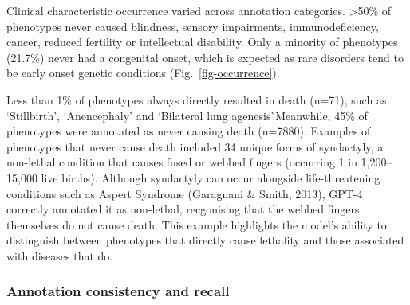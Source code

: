 \documentclass[
]{agujournal2019}
\begin{document}
Clinical characteristic occurrence varied across annotation categories.
\textgreater50\% of phenotypes never caused blindness, sensory
impairments, immunodeficiency, cancer, reduced fertility or intellectual
disability. Only a minority of phenotypes (21.7\%) never had a
congenital onset, which is expected as rare disorders tend to be early
onset genetic conditions (Fig.~\ref{fig-occurrence}).

Less than 1\% of phenotypes always directly resulted in death (n=71),
such as `Stillbirth', `Anencephaly' and `Bilateral lung
agenesis'.Meanwhile, 45\% of phenotypes were annotated as never causing
death (n=7880). Examples of phenotypes that never cause death included
34 unique forms of syndactyly, a non-lethal condition that causes fused
or webbed fingers (occurring 1 in 1,200--15,000 live births). Although
syndactyly can occur alongside life-threatening conditions such as
Aspert Syndrome (Garagnani \& Smith, 2013), GPT-4 correctly annotated it
as non-lethal, recgonising that the webbed fingers themselves do not
cause death. This example highlights the model's ability to distinguish
between phenotypes that directly cause lethality and those associated
with diseases that do.

\subsubsection{Annotation consistency and
recall}\label{annotation-consistency-and-recall}
\end{document}
